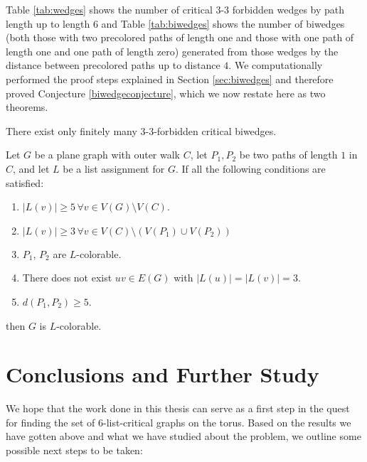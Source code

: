 Table \ref{tab:wedges} shows the number of critical 3-3 forbidden wedges by path length up to
length $6$ and Table \ref{tab:biwedges} shows the number of biwedges (both those with two precolored
paths of length one and those with one path of length one and one path of length zero) generated
from those wedges by the distance between precolored paths up to distance $4$. We computationally performed the proof steps explained in Section \ref{sec:biwedges} and therefore proved Conjecture 
\ref{biwedgeconjecture}, which
we now restate here as two theorems. 


\begin{theorem}
There exist only finitely many 3-3-forbidden critical biwedges.
\end{theorem}

\begin{theorem}
Let $G$ be a plane graph with outer walk $C$, let $P_1, P_2$ be two paths of length $1$ in $C$, and let
$L$ be a list assignment for $G$. If all the following conditions are satisfied:

\begin{enumerate}
	\item $|L(v)| \geq 5 \, \forall v \in V(G) \setminus V(C)$.
	\item $|L(v)| \geq 3 \, \forall v \in V(C) \setminus (V(P_1) \cup V(P_2))$
	\item $P_1$, $P_2$ are $L$-colorable.
	\item There does not exist $uv \in E(G)$ with $|L(u)| = |L(v)| = 3$.
	\item $d(P_1, P_2) \geq 5$.
\end{enumerate}

then $G$ is $L$-colorable. 
\end{theorem}



 

\section{Conclusions and Further Study}

We hope that the work done in this thesis can serve as a first step in the quest for finding the
set of 6-list-critical graphs on the torus. Based on the results we have gotten above and what 
we have studied about the problem, we outline some possible next steps to be taken:

